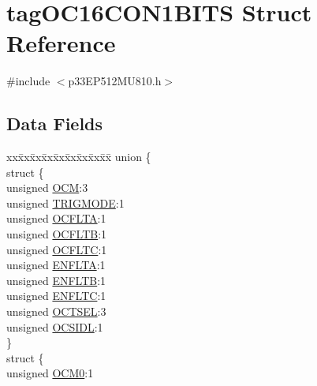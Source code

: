 \hypertarget{structtag_o_c16_c_o_n1_b_i_t_s}{}\section{tag\+O\+C16\+C\+O\+N1\+B\+I\+TS Struct Reference}
\label{structtag_o_c16_c_o_n1_b_i_t_s}


{\ttfamily \#include $<$p33\+E\+P512\+M\+U810.\+h$>$}

\subsection*{Data Fields}
\begin{DoxyCompactItemize}
\item 
\begin{tabbing}
xx\=xx\=xx\=xx\=xx\=xx\=xx\=xx\=xx\=\kill
union \{\\
\>struct \{\\
\>\>unsigned \hyperlink{structtag_o_c16_c_o_n1_b_i_t_s_a778fa0cf51a9477ac4e82d71a8733801}{OCM}:3\\
\>\>unsigned \hyperlink{structtag_o_c16_c_o_n1_b_i_t_s_a7a0057e0dca6e2663584b5b9e1da04c3}{TRIGMODE}:1\\
\>\>unsigned \hyperlink{structtag_o_c16_c_o_n1_b_i_t_s_acc967e41cecdeedc6ad4422f9ef1a6a3}{OCFLTA}:1\\
\>\>unsigned \hyperlink{structtag_o_c16_c_o_n1_b_i_t_s_a1fb30bb4421ef7c4bd0c66c379875593}{OCFLTB}:1\\
\>\>unsigned \hyperlink{structtag_o_c16_c_o_n1_b_i_t_s_a69a1772a4144abd579d17d28445b9934}{OCFLTC}:1\\
\>\>unsigned \hyperlink{structtag_o_c16_c_o_n1_b_i_t_s_a1e0f05fb23d516e003e4713fe8c1498a}{ENFLTA}:1\\
\>\>unsigned \hyperlink{structtag_o_c16_c_o_n1_b_i_t_s_a9d7aa97d5328b8b81ab7fd9145dfa0fc}{ENFLTB}:1\\
\>\>unsigned \hyperlink{structtag_o_c16_c_o_n1_b_i_t_s_a0b6f25c0f83f33b5501b6a2e6141a6ef}{ENFLTC}:1\\
\>\>unsigned \hyperlink{structtag_o_c16_c_o_n1_b_i_t_s_ae37d2a41dae2d2af1d82f7caae33cadb}{OCTSEL}:3\\
\>\>unsigned \hyperlink{structtag_o_c16_c_o_n1_b_i_t_s_afd05f4f249db4ef69b684e2f3fa6b703}{OCSIDL}:1\\
\>\} \\
\>struct \{\\
\>\>unsigned \hyperlink{structtag_o_c16_c_o_n1_b_i_t_s_a9271e84c9759ff10a7bc1cee3276e8f6}{OCM0}:1\\

\end{tabbing}
\end{DoxyCompactItemize}
